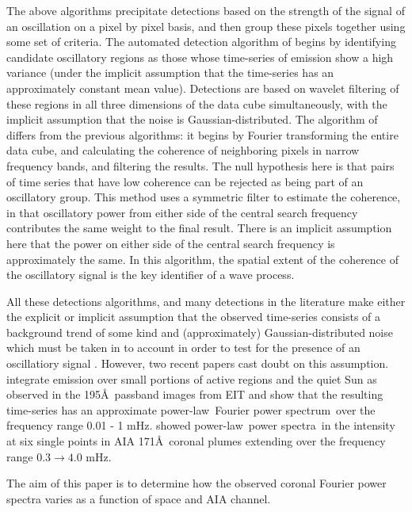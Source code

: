 \documentclass[onecolumn]{emulateapj}
\newcommand{\PS}{power spectrum}
\newcommand{\PA}{power spectra}
\newcommand{\PL}{power-law}
\newcommand{\Fps}{Fourier \PS}
\newcommand{\BF}{ }
\begin{document}
The above algorithms precipitate detections based on the strength of
the signal of an oscillation on a pixel by pixel basis, and then group
these pixels together using some set of criteria.  The automated
detection algorithm of \cite{2008SoPh..248..395S} begins by
identifying candidate oscillatory regions as those whose time-series
of emission show a high variance \citep{2003SoPh..213..103G} (under
the implicit assumption that the time-series has an approximately
constant mean value).  Detections are based on wavelet filtering of
these regions in all three dimensions of the data cube simultaneously,
with the implicit assumption that the noise is Gaussian-distributed.
{\BF The algorithm of \cite{2008SoPh..252..321M} differs from the
  previous algorithms: it begins by Fourier transforming the entire
  data cube, and calculating the coherence of neighboring pixels in
  narrow frequency bands, and filtering the results. The null
  hypothesis here is that pairs of time series that have low coherence
  can be rejected as being part of an oscillatory group.  This method
  uses a symmetric filter to estimate the coherence, in that
  oscillatory power from either side of the central search frequency
  contributes the same weight to the final result.  There is an
  implicit assumption here that the power on either side of the
  central search frequency is approximately the same.  In this
  algorithm, the spatial extent of the coherence of the oscillatory
  signal is the key identifier of a wave process.}

All these detections algorithms, and many detections in the literature
make either the explicit or implicit assumption that the observed
time-series consists of a background trend of some kind and
(approximately) Gaussian-distributed noise which must be taken in to
account in order to test for the presence of an oscillatiory signal
{\BF \citep{2004SoPh..223....1D, 2007SoPh..241..397N,
    2008SoPh..248..395S, 2010SoPh..264..403I, 2013SoPh..286..405C}.}
{\BF However, two recent papers cast doubt on this assumption.
  \cite{2014AA...563A...8A} integrate emission over small portions of
  active regions and the quiet Sun as observed in the 195\AA\ passband
  images from EIT and show that the resulting time-series has an
  approximate \PL\ \Fps\ over the frequency range 0.01 - 1 mHz.
  \citet{gupta2014} showed \PL\ \PA\ in the intensity at six single
  points in AIA 171\AA\ coronal plumes extending over the frequency range
  $0.3\rightarrow 4.0$ mHz.}

The aim of this paper is to determine how the observed coronal Fourier
power spectra varies as a function of space and AIA channel.
\end{document}
